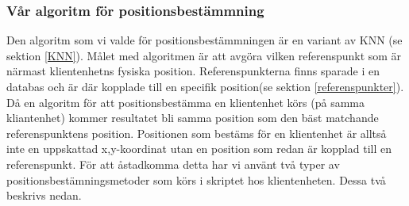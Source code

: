 \documentclass[swedish, a4paper,12pt]{article}
\begin{document}
\subsubsection{Vår algoritm för positionsbestämmning}
Den algoritm som vi valde för positionsbestämmningen är en variant av KNN (se sektion \ref{KNN}).
Målet med algoritmen är att avgöra vilken referenspunkt som är närmast klientenhetns fysiska position. Referenspunkterna finns sparade i en databas och är där kopplade till en specifik position(se sektion \ref{referenspunkter}). Då en algoritm för att positionsbestämma en klientenhet körs (på samma kliantenhet) kommer resultatet bli samma position som den bäst matchande referenspunktens position. Positionen som bestäms för en klientenhet är alltså inte en uppskattad x,y-koordinat utan en position som redan är kopplad till en referenspunkt.
För att åstadkomma detta har vi använt två typer av positionsbestämningsmetoder som körs i skriptet hos klientenheten. Dessa två beskrivs nedan.
\end{document}
